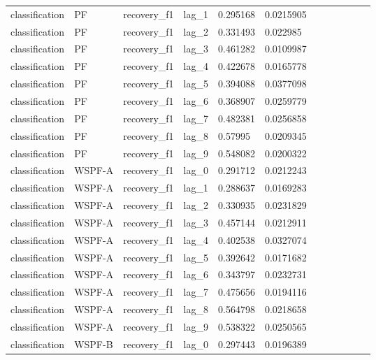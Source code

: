 \begin{tabular}{llllllllllll}
classification & PF & recovery\_f1 & lag\_1 & 0.295168 & 0.0215905 &  &  &  &  &  &  \\
classification & PF & recovery\_f1 & lag\_2 & 0.331493 & 0.022985 &  &  &  &  &  &  \\
classification & PF & recovery\_f1 & lag\_3 & 0.461282 & 0.0109987 &  &  &  &  &  &  \\
classification & PF & recovery\_f1 & lag\_4 & 0.422678 & 0.0165778 &  &  &  &  &  &  \\
classification & PF & recovery\_f1 & lag\_5 & 0.394088 & 0.0377098 &  &  &  &  &  &  \\
classification & PF & recovery\_f1 & lag\_6 & 0.368907 & 0.0259779 &  &  &  &  &  &  \\
classification & PF & recovery\_f1 & lag\_7 & 0.482381 & 0.0256858 &  &  &  &  &  &  \\
classification & PF & recovery\_f1 & lag\_8 & 0.57995 & 0.0209345 &  &  &  &  &  &  \\
classification & PF & recovery\_f1 & lag\_9 & 0.548082 & 0.0200322 &  &  &  &  &  &  \\
classification & WSPF-A & recovery\_f1 & lag\_0 & 0.291712 & 0.0212243 &  &  &  &  &  &  \\
classification & WSPF-A & recovery\_f1 & lag\_1 & 0.288637 & 0.0169283 &  &  &  &  &  &  \\
classification & WSPF-A & recovery\_f1 & lag\_2 & 0.330935 & 0.0231829 &  &  &  &  &  &  \\
classification & WSPF-A & recovery\_f1 & lag\_3 & 0.457144 & 0.0212911 &  &  &  &  &  &  \\
classification & WSPF-A & recovery\_f1 & lag\_4 & 0.402538 & 0.0327074 &  &  &  &  &  &  \\
classification & WSPF-A & recovery\_f1 & lag\_5 & 0.392642 & 0.0171682 &  &  &  &  &  &  \\
classification & WSPF-A & recovery\_f1 & lag\_6 & 0.343797 & 0.0232731 &  &  &  &  &  &  \\
classification & WSPF-A & recovery\_f1 & lag\_7 & 0.475656 & 0.0194116 &  &  &  &  &  &  \\
classification & WSPF-A & recovery\_f1 & lag\_8 & 0.564798 & 0.0218658 &  &  &  &  &  &  \\
classification & WSPF-A & recovery\_f1 & lag\_9 & 0.538322 & 0.0250565 &  &  &  &  &  &  \\
classification & WSPF-B & recovery\_f1 & lag\_0 & 0.297443 & 0.0196389 &  &  &  &  &  &  \\

\end{tabular}
